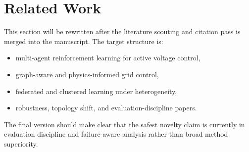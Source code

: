 \section{Related Work}

This section will be rewritten after the literature scouting and citation pass is merged into the manuscript. The target structure is:

\begin{itemize}[leftmargin=1.5em]
  \item multi-agent reinforcement learning for active voltage control,
  \item graph-aware and physics-informed grid control,
  \item federated and clustered learning under heterogeneity,
  \item robustness, topology shift, and evaluation-discipline papers.
\end{itemize}

The final version should make clear that the safest novelty claim is currently in evaluation discipline and failure-aware analysis rather than broad method superiority.
